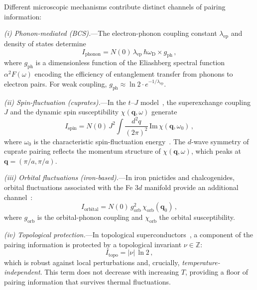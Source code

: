 \documentclass[prb,twocolumn,superscriptaddress,longbibliography,floatfix]{revtex4-2}
\newcommand{\oD}{\omega_{\mathrm{D}}}
\begin{document}
Different microscopic mechanisms contribute distinct
channels of pairing information:

\textit{(i) Phonon-mediated (BCS).}---The electron-phonon
coupling constant $\lambda_{\mathrm{ep}}$ and density of
states determine~\cite{Eliashberg1960,McMillan1968}
\begin{equation}\label{eq:I_phonon}
  I_{\mathrm{phonon}} =
  N(0)\, \lambda_{\mathrm{ep}}\, \hbar\oD
  \times g_{\mathrm{ph}}\,,
\end{equation}
where $g_{\mathrm{ph}}$ is a dimensionless function of the
Eliashberg spectral function $\alpha^2 F(\omega)$ encoding
the efficiency of entanglement transfer from phonons to
electron pairs.  For weak coupling,
$g_{\mathrm{ph}} \approx \ln 2 \cdot e^{-1/\lambda_{\mathrm{ep}}}$.

\textit{(ii) Spin-fluctuation (cuprates).}---In the
$t$--$J$ model~\cite{Anderson1987}, the superexchange coupling $J$
and the dynamic spin susceptibility $\chi(\bm{q},\omega)$ generate
\begin{equation}\label{eq:I_spin}
  I_{\mathrm{spin}} =
  N(0)\, J^2 \int \frac{d^2 q}{(2\pi)^2}\,
  \mathrm{Im}\,\chi(\bm{q},\omega_0)\,,
\end{equation}
where $\omega_0$ is the characteristic spin-fluctuation
energy~\cite{Scalapino1986,Moriya2000}.  The $d$-wave symmetry
of cuprate pairing reflects the momentum structure of
$\chi(\bm{q},\omega)$, which peaks at
$\bm{q} = (\pi/a, \pi/a)$.

\textit{(iii) Orbital fluctuations (iron-based).}---In iron
pnictides and chalcogenides, orbital fluctuations associated
with the Fe $3d$ manifold provide an additional
channel~\cite{Kontani2010}:
\begin{equation}\label{eq:I_orbital}
  I_{\mathrm{orbital}} =
  N(0)\, g_{\mathrm{orb}}^2\,
  \chi_{\mathrm{orb}}(\bm{q}_0)\,,
\end{equation}
where $g_{\mathrm{orb}}$ is the orbital-phonon coupling and
$\chi_{\mathrm{orb}}$ the orbital susceptibility.

\textit{(iv) Topological protection.}---In topological
superconductors~\cite{Fu2008,Sato2017}, a component of the pairing
information is protected by a topological invariant $\nu \in \mathbb{Z}$:
\begin{equation}\label{eq:I_topo}
  I_{\mathrm{topo}} = |\nu|\, \ln 2\,,
\end{equation}
which is robust against local perturbations and, crucially,
\emph{temperature-independent}.  This term does not decrease
with increasing $T$, providing a floor of pairing information
that survives thermal fluctuations.
\end{document}
